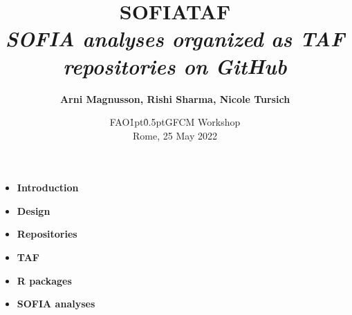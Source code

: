 \documentclass[aspectratio=169]{beamer}
\begin{document}
\begin{frame}
  \title{\vspace{-4ex}
    \darkgray SOFIA\raisebox{1pt}{\h{1.5pt}-\h{-1pt}}TAF\\[2ex]
    \normalsize\blue\mdseries\it
    SOFIA analyses organized as TAF repositories on GitHub}
  \author{\vspace{-10ex}\darkgray\bf
    Arni Magnusson, Rishi Sharma, Nicole Tursich}
  \date{\vspace{-1ex}\darkgray FAO\h{1pt}\raisebox{1pt}{-}\h{0.5pt}GFCM Workshop\\[0.3ex]
    Rome, 25 May 2022}
  \titlepage
\end{frame}


\begin{frame}{\SOFIATAF}
  \begin{itemize}
    \item[]{\darkgray\bf Introduction}
    \\[3.5ex]
    \item[]{\darkgray\bf Design}
    \\[3.5ex]
    \item[]{\darkgray\bf Repositories}
    \\[3.5ex]
    \item[]{\darkgray\bf TAF}
    \\[3.5ex]
    \item[]{\darkgray\bf R packages}
    \\[3.5ex]
    \item[]{\darkgray\bf SOFIA analyses}
    \\[3.5ex]
  \end{itemize}
\end{frame}

\end{document}
